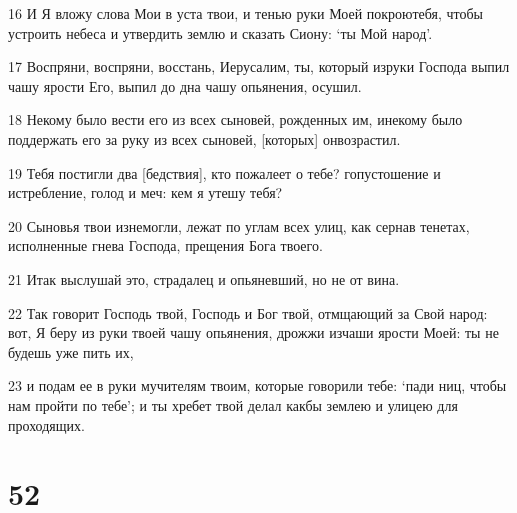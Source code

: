 \par 16 И Я вложу слова Мои в уста твои, и тенью руки Моей покроютебя, чтобы устроить небеса и утвердить землю и сказать Сиону: `ты Мой народ'.
\par 17 Воспряни, воспряни, восстань, Иерусалим, ты, который изруки Господа выпил чашу ярости Его, выпил до дна чашу опьянения, осушил.
\par 18 Некому было вести его из всех сыновей, рожденных им, инекому было поддержать его за руку из всех сыновей, [которых] онвозрастил.
\par 19 Тебя постигли два [бедствия], кто пожалеет о тебе? гопустошение и истребление, голод и меч: кем я утешу тебя?
\par 20 Сыновья твои изнемогли, лежат по углам всех улиц, как сернав тенетах, исполненные гнева Господа, прещения Бога твоего.
\par 21 Итак выслушай это, страдалец и опьяневший, но не от вина.
\par 22 Так говорит Господь твой, Господь и Бог твой, отмщающий за Свой народ: вот, Я беру из руки твоей чашу опьянения, дрожжи изчаши ярости Моей: ты не будешь уже пить их,
\par 23 и подам ее в руки мучителям твоим, которые говорили тебе: `пади ниц, чтобы нам пройти по тебе'; и ты хребет твой делал какбы землею и улицею для проходящих.

\chapter{52}

